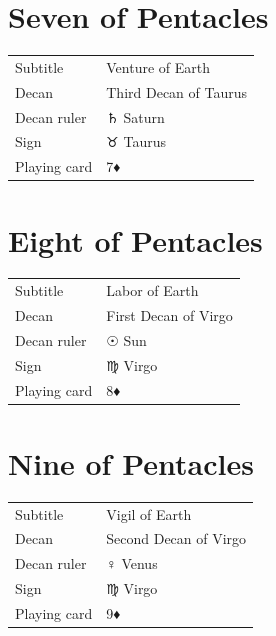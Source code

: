 \newpage
\section*{Seven of Pentacles}

\begin{center}
\end{center}

\vspace{4mm}
\noindent\begin{tabular}{@{}l@{\quad}l@{}}
Subtitle & Venture of Earth \\
Decan & Third Decan of Taurus \\
Decan ruler & {\symbfont ♄} Saturn \\
Sign & {\symbfont ♉} Taurus \\
Playing card & 7♦ \\
\end{tabular}

\newpage
\section*{Eight of Pentacles}

\begin{center}
\end{center}

\vspace{4mm}
\noindent\begin{tabular}{@{}l@{\quad}l@{}}
Subtitle & Labor of Earth \\
Decan & First Decan of Virgo \\
Decan ruler & {\symbfont ☉} Sun \\
Sign & {\symbfont ♍} Virgo \\
Playing card & 8♦ \\
\end{tabular}

\newpage
\section*{Nine of Pentacles}

\begin{center}
\end{center}

\vspace{4mm}
\noindent\begin{tabular}{@{}l@{\quad}l@{}}
Subtitle & Vigil of Earth \\
Decan & Second Decan of Virgo \\
Decan ruler & {\symbfont ♀} Venus \\
Sign & {\symbfont ♍} Virgo \\
Playing card & 9♦ \\
\end{tabular}

